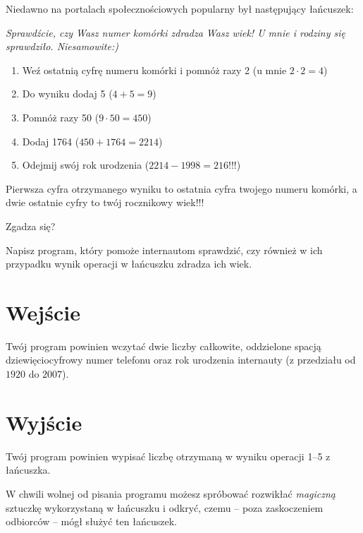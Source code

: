 \documentclass{spiral-kurs}
\begin{document}
\makeheader
%
    Niedawno na portalach społecznościowych popularny był następujący łańcuszek:

    \medskip
    {\it
      \noindent
      Sprawdźcie, czy Wasz numer komórki zdradza Wasz wiek! U mnie i rodziny się sprawdziło. Niesamowite:)
      \begin{enumerate}
        \item Weź ostatnią cyfrę numeru komórki i pomnóż razy 2 (u mnie $2 \cdot 2=4$)
        \item Do wyniku dodaj 5 ($4+5=9$)
        \item Pomnóż razy 50 ($9 \cdot 50=450$)
        \item Dodaj 1764 ($450+1764=2214$)
        \item Odejmij swój rok urodzenia ($2214-1998=216$!!!)
      \end{enumerate}
      Pierwsza cyfra otrzymanego wyniku to ostatnia cyfra twojego numeru komórki, a dwie ostatnie cyfry to twój rocznikowy wiek!!!

      \medskip
      \noindent
      Zgadza się?
    }

    \medskip
    \noindent
    Napisz program, który pomoże internautom sprawdzić, czy również w ich przypadku
    wynik operacji w łańcuszku zdradza ich wiek.

    \section{Wejście}
    Twój program powinien wczytać dwie liczby całkowite, oddzielone spacją dziewięciocyfrowy numer telefonu
    oraz rok urodzenia internauty (z przedziału od $1920$ do $2007$).

    \section{Wyjście}
    Twój program powinien wypisać liczbę otrzymaną w wyniku operacji 1--5 z łańcuszka.


    \medskip
    \noindent
    W chwili wolnej od pisania programu możesz spróbować rozwikłać \emph{magiczną}
    sztuczkę wykorzystaną w łańcuszku i odkryć, czemu -- poza zaskoczeniem odbiorców
    -- mógł służyć ten łańcuszek.


  
\end{document}
